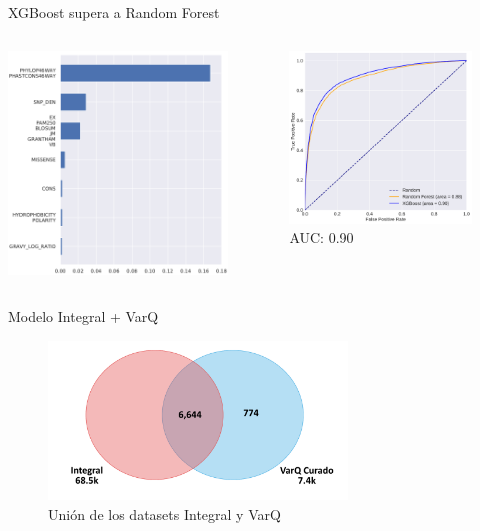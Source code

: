 \documentclass[
  spanish,
  ignorenonframetext,
]{beamer}
\begin{document}
\begin{frame}{XGBoost supera a Random Forest}
\protect\hypertarget{xgboost-supera-a-random-forest}{}

\begin{columns}[T]
\begin{column}{0.48\textwidth}
\includegraphics[width=2.44792in,height=\textheight]{integral_importance_cluster_xgb.pdf}
\end{column}

\begin{column}{0.48\textwidth}
\begin{figure}
\centering
\includegraphics[width=2.08333in,height=\textheight]{auc_integral.pdf}
\caption{AUC: 0.90}
\end{figure}
\end{column}
\end{columns}

\end{frame}

\begin{frame}{Modelo Integral + VarQ}
\protect\hypertarget{modelo-integral-varq}{}

\begin{figure}
\centering
\includegraphics[width=3.125in,height=\textheight]{interseccion_varq_integral.pdf}
\caption{Unión de los datasets Integral y VarQ}
\end{figure}

\end{frame}
\end{document}
